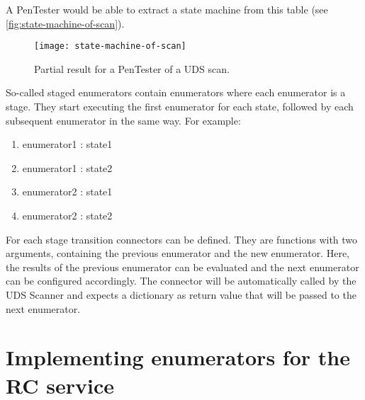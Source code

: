 A PenTester would be able to extract a state machine from this table (see \autoref{fig:state-machine-of-scan}).

\begin{figure}[H]
    \centering
    \texttt{[image: state-machine-of-scan]}
    \caption{Partial result for a PenTester of a UDS scan.}
    \label{fig:state-machine-of-scan}
\end{figure}

So-called staged enumerators contain enumerators where each enumerator is a stage. They start executing the first enumerator for each state, followed by each subsequent enumerator in the same way. For example:
\begin{enumerate}
    \item enumerator1 : state1
    \item enumerator1 : state2
    \item enumerator2 : state1
    \item enumerator2 : state2
\end{enumerate}

For each stage transition connectors can be defined. They are functions with two arguments, containing the previous enumerator and the new enumerator. Here, the results of the previous enumerator can be evaluated and the next enumerator can be configured accordingly. The connector will be automatically called by the UDS Scanner and expects a dictionary as return value that will be passed to the next enumerator. 


\section{Implementing enumerators for the RC service}

